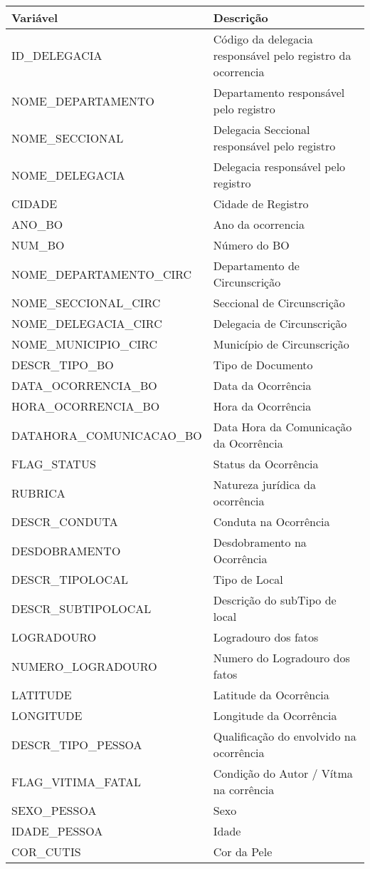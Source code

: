 \documentclass[
  12pt,
]{report}
\begin{document}
\begin{tabular}{l|l}
\hline
Variável & Descrição\\
\hline
ID\_DELEGACIA & Código da delegacia responsável pelo registro da ocorrencia\\
\hline
NOME\_DEPARTAMENTO & Departamento responsável pelo registro\\
\hline
NOME\_SECCIONAL & Delegacia Seccional responsável pelo registro\\
\hline
NOME\_DELEGACIA & Delegacia responsável pelo registro\\
\hline
CIDADE & Cidade de Registro\\
\hline
ANO\_BO & Ano da ocorrencia\\
\hline
NUM\_BO & Número do BO\\
\hline
NOME\_DEPARTAMENTO\_CIRC & Departamento de Circunscrição\\
\hline
NOME\_SECCIONAL\_CIRC & Seccional de Circunscrição\\
\hline
NOME\_DELEGACIA\_CIRC & Delegacia de Circunscrição\\
\hline
NOME\_MUNICIPIO\_CIRC & Município de Circunscrição\\
\hline
DESCR\_TIPO\_BO & Tipo de Documento\\
\hline
DATA\_OCORRENCIA\_BO & Data da Ocorrência\\
\hline
HORA\_OCORRENCIA\_BO & Hora da Ocorrência\\
\hline
DATAHORA\_COMUNICACAO\_BO & Data Hora da Comunicação da Ocorrência\\
\hline
FLAG\_STATUS & Status da Ocorrência\\
\hline
RUBRICA & Natureza jurídica da ocorrência\\
\hline
DESCR\_CONDUTA & Conduta na Ocorrência\\
\hline
DESDOBRAMENTO & Desdobramento na Ocorrência\\
\hline
DESCR\_TIPOLOCAL & Tipo de Local\\
\hline
DESCR\_SUBTIPOLOCAL & Descrição do subTipo de local\\
\hline
LOGRADOURO & Logradouro dos fatos\\
\hline
NUMERO\_LOGRADOURO & Numero do Logradouro dos fatos\\
\hline
LATITUDE & Latitude da Ocorrência\\
\hline
LONGITUDE & Longitude da Ocorrência\\
\hline
DESCR\_TIPO\_PESSOA & Qualificação do envolvido na ocorrência\\
\hline
FLAG\_VITIMA\_FATAL & Condição do Autor / Vítma na corrência\\
\hline
SEXO\_PESSOA & Sexo\\
\hline
IDADE\_PESSOA & Idade\\
\hline
COR\_CUTIS & Cor da Pele\\
\hline
\end{tabular}
\end{document}
